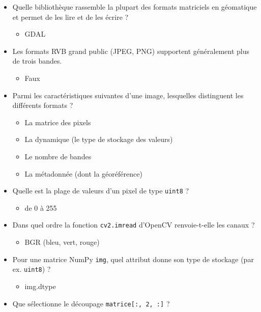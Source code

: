 \documentclass[
  french,
  11pt,
  letterpaper,
  open=any,
  twoside=false,
  french]{scrbook}
\providecommand{\tightlist}{%
  \setlength{\itemsep}{0pt}\setlength{\parskip}{0pt}}
\begin{document}
\begin{itemize}
\tightlist
\item
  Quelle bibliothèque rassemble la plupart des formats matriciels en
  géomatique et permet de les lire et de les écrire ?

  \begin{itemize}
  \tightlist
  \item
    GDAL
  \end{itemize}
\item
  Les formats RVB grand public (JPEG, PNG) supportent généralement plus
  de trois bandes.

  \begin{itemize}
  \tightlist
  \item
    Faux
  \end{itemize}
\item
  Parmi les caractéristiques suivantes d'une image, lesquelles
  distinguent les différents formats ?

  \begin{itemize}
  \tightlist
  \item
    La matrice des pixels
  \item
    La dynamique (le type de stockage des valeurs)
  \item
    Le nombre de bandes
  \item
    La métadonnée (dont la géoréférence)
  \end{itemize}
\item
  Quelle est la plage de valeurs d'un pixel de type \texttt{uint8} ?

  \begin{itemize}
  \tightlist
  \item
    de 0 à 255
  \end{itemize}
\item
  Dans quel ordre la fonction \texttt{cv2.imread} d'OpenCV
  renvoie-t-elle les canaux ?

  \begin{itemize}
  \tightlist
  \item
    BGR (bleu, vert, rouge)
  \end{itemize}
\item
  Pour une matrice NumPy \texttt{img}, quel attribut donne son type de
  stockage (par ex. \texttt{uint8}) ?

  \begin{itemize}
  \tightlist
  \item
    img.dtype
  \end{itemize}
\item
  Que sélectionne le découpage \texttt{matrice{[}:,\ 2,\ :{]}} ?


\end{itemize}
\end{document}
